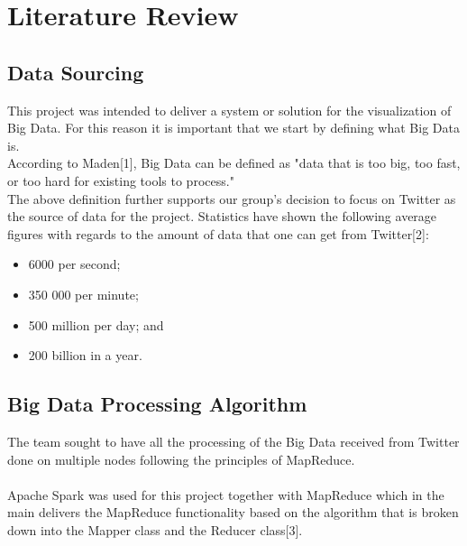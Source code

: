 \documentclass[12pt]{article} %
\begin{document}
	\section{Literature Review}
	
	\subsection {Data Sourcing}
	
	This project was intended to deliver a system or solution for the visualization of Big Data. For this reason it is important that we start by defining what Big Data is.
	\\
	According to Maden[1], Big Data can be defined as "data that is too big, too fast, or too hard for existing tools to process."
	\\
	The above definition further supports our group's decision to focus on Twitter as the source of data for the project. Statistics have shown the following average figures with regards to the amount of data that one can get from Twitter[2]:
	\\
	
		\begin{itemize}
			\item 6000 per second; 
			\item 350 000 per minute;
			\item 500 million per day; and
			\item 200 billion in a year.
		\end{itemize}
	
	\subsection {Big Data Processing Algorithm}
	
	The team sought to have all the processing of the Big Data received from Twitter done on multiple nodes following the principles of MapReduce.
	\\
	\\
	Apache Spark was used for this project together with MapReduce which in the main delivers the MapReduce functionality based on the algorithm that is broken down into the Mapper class and the Reducer class[3].

	
	
	
\end{document}
